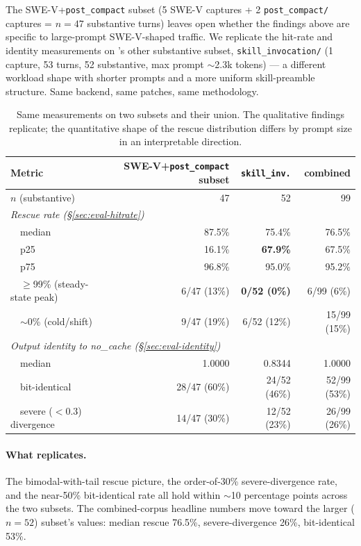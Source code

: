 The SWE-V+\texttt{post\_compact} subset (5 SWE-V captures + 2 \texttt{post\_compact/} captures =
$n{=}47$ substantive turns) leaves open whether the findings above
are specific to large-prompt SWE-V-shaped traffic. We replicate the
hit-rate and identity measurements on \dataset's other substantive
subset, \texttt{skill\_invocation/} (1 capture, 53 turns, 52
substantive, max prompt $\sim$2.3k tokens) --- a different workload
shape with shorter prompts and a more uniform skill-preamble
structure. Same backend, same patches, same methodology.

\begin{table}[t]
\small
\centering
\begin{tabular}{lrrr}
\toprule
Metric & SWE-V+\texttt{post\_compact} subset & \texttt{skill\_inv.} & combined \\
\midrule
$n$ (substantive)              & 47       & 52       & 99 \\
\midrule
\multicolumn{4}{l}{\emph{Rescue rate (\S\ref{sec:eval-hitrate})}} \\
~~median                       & 87.5\%   & 75.4\%   & 76.5\% \\
~~p25                          & 16.1\%   & \textbf{67.9\%} & 67.5\% \\
~~p75                          & 96.8\%   & 95.0\%   & 95.2\% \\
~~$\geq$99\% (steady-state peak) & 6/47 (13\%) & \textbf{0/52 (0\%)} & 6/99 (6\%) \\
~~$\sim$0\% (cold/shift)       & 9/47 (19\%) & 6/52 (12\%) & 15/99 (15\%) \\
\midrule
\multicolumn{4}{l}{\emph{Output identity to no\_cache (\S\ref{sec:eval-identity})}} \\
~~median                       & 1.0000   & 0.8344   & 1.0000 \\
~~bit-identical                & 28/47 (60\%) & 24/52 (46\%) & 52/99 (53\%) \\
~~severe ($<$0.3) divergence   & 14/47 (30\%) & 12/52 (23\%) & 26/99 (26\%) \\
\bottomrule
\end{tabular}
\caption{Same measurements on two \dataset{} subsets and their
union. The qualitative findings replicate; the quantitative shape
of the rescue distribution differs by prompt size in an interpretable
direction.}
\label{tab:cross-corpus}
\end{table}

\paragraph{What replicates.} The bimodal-with-tail rescue picture,
the order-of-30\% severe-divergence rate, and the
near-50\% bit-identical rate all hold within $\sim$10 percentage
points across the two subsets. The combined-corpus headline numbers
move toward the larger ($n{=}52$) subset's values: median rescue
76.5\%, severe-divergence 26\%, bit-identical 53\%.

